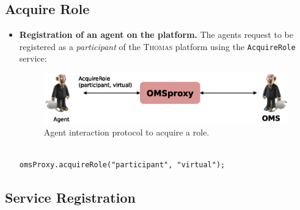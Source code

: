 \subsection{Acquire Role}
\begin{itemize}
\item \textbf{Registration of an agent on the platform.} The agents request to be registered as a \textit{participant} of the \textsc{Thomas} platform using the \lstinline|AcquireRole| service:
\begin{figure}[h!t]
	\centering
	\includegraphics[width=.8\textwidth]{Thomas/images/acquireRoleparticipant}
	\caption{Agent interaction protocol to acquire a role.}
\end{figure}
\begin{lstlisting}

omsProxy.acquireRole("participant", "virtual");

\end{lstlisting}


\end{itemize}

\subsection{Service Registration}

